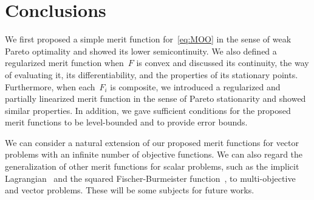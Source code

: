 \documentclass[../main]{subfiles}
\begin{document}
\section{Conclusions}
We first proposed a simple merit function for~\cref{eq:MOO} in the sense of weak Pareto optimality and showed its lower semicontinuity.
We also defined a regularized merit function when~$F$ is convex and discussed its continuity, the way of evaluating it, its differentiability, and the properties of its stationary points.
Furthermore, when each~$F_i$ is composite, we introduced a regularized and partially linearized merit function in the sense of Pareto stationarity and showed similar properties.
In addition, we gave sufficient conditions for the proposed merit functions to be level-bounded and to provide error bounds.

We can consider a natural extension of our proposed merit functions for vector problems with an infinite number of objective functions.
We can also regard the generalization of other merit functions for scalar problems, such as the implicit Lagrangian~\cite{Mangasarian1993} and the squared Fischer-Burmeister function~\cite{Kanzow1996}, to multi-objective and vector problems.
These will be some subjects for future works.
\end{document}
